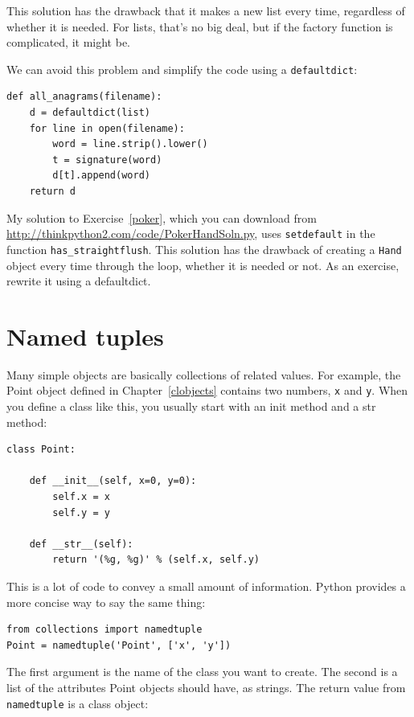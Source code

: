 \documentclass[10pt]{book}
\begin{document}
This solution has the drawback that it makes a new list
every time, regardless of whether it is needed.  For lists,
that's no big deal, but if the factory
function is complicated, it might be.

We can avoid this problem and 
simplify the code using a {\tt defaultdict}:

\begin{verbatim}
def all_anagrams(filename):
    d = defaultdict(list)
    for line in open(filename):
        word = line.strip().lower()
        t = signature(word)
        d[t].append(word)
    return d
\end{verbatim}

My solution to Exercise~\ref{poker}, which you can download from
\url{http://thinkpython2.com/code/PokerHandSoln.py},
uses {\tt setdefault} in the function
\verb"has_straightflush".  This solution has the drawback
of creating a {\tt Hand} object every time through the loop, whether
it is needed or not.  As an exercise, rewrite it using
a defaultdict.


\section{Named tuples}

Many simple objects are basically collections of related values.
For example, the Point object defined in Chapter~\ref{clobjects} contains
two numbers, {\tt x} and {\tt y}.  When you define a class like
this, you usually start with an init method and a str method:

\begin{verbatim}
class Point:

    def __init__(self, x=0, y=0):
        self.x = x
        self.y = y

    def __str__(self):
        return '(%g, %g)' % (self.x, self.y)
\end{verbatim}

This is a lot of code to convey a small amount of information.
Python provides a more concise way to say the same thing:

\begin{verbatim}
from collections import namedtuple
Point = namedtuple('Point', ['x', 'y'])
\end{verbatim}

The first argument is the name of the class you want to create.
The second is a list of the attributes Point objects should have,
as strings.  The return value from {\tt namedtuple} is a class object:
\end{document}
